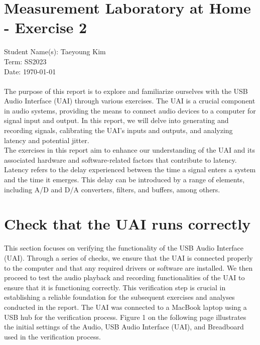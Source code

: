 \documentclass[
	a4paper,
	11pt,
]{article}
\begin{document}
\fancyhf{} %

\section*{Measurement Laboratory at Home - Exercise 2}
Student Name(s): Taeyoung Kim\\
Term: SS2023 \\
Date: \today \\
\indent \\

The purpose of this report is to explore and familiarize ourselves with the USB Audio Interface (UAI) through various exercises. The UAI is a crucial component in audio systems, providing the means to connect audio devices to a computer for signal input and output. In this report, we will delve into generating and recording signals, calibrating the UAI's inputs and outputs, and analyzing latency and potential jitter. \\
The exercises in this report aim to enhance our understanding of the UAI and its associated hardware and software-related factors that contribute to latency. Latency refers to the delay experienced between the time a signal enters a system and the time it emerges. This delay can be introduced by a range of elements, including A/D and D/A converters, filters, and buffers, among others.

\section{Check that the UAI runs correctly}
This section focuses on verifying the functionality of the USB Audio Interface (UAI). Through a series of checks, we ensure that the UAI is connected properly to the computer and that any required drivers or software are installed. We then proceed to test the audio playback and recording functionalities of the UAI to ensure that it is functioning correctly. This verification step is crucial in establishing a reliable foundation for the subsequent exercises and analyses conducted in the report. The UAI was connected to a MacBook laptop using a USB hub for the verification process.
Figure 1 on the following page illustrates the initial settings of the Audio, USB Audio Interface (UAI), and Breadboard used in the verification process.
\end{document}
